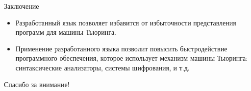 \documentclass[14pt,pdf,hyperref={unicode}]{beamer}
\begin{document}
\begin{frame}{Заключение}
	\begin{itemize}
		\item Разработанный язык позволяет избавится от избыточности представления программ для машины Тьюринга.
		\item Применение разработанного языка позволит повысить быстродействие программного обеспечения, которое использует механизм машины Тьюринга: синтаксические анализаторы, системы шифрования, и т.д.
	\end{itemize}
\end{frame}

\begin{frame}[plain]
	\begin{center}
		Спасибо за внимание!
	\end{center}
\end{frame}
\end{document}
